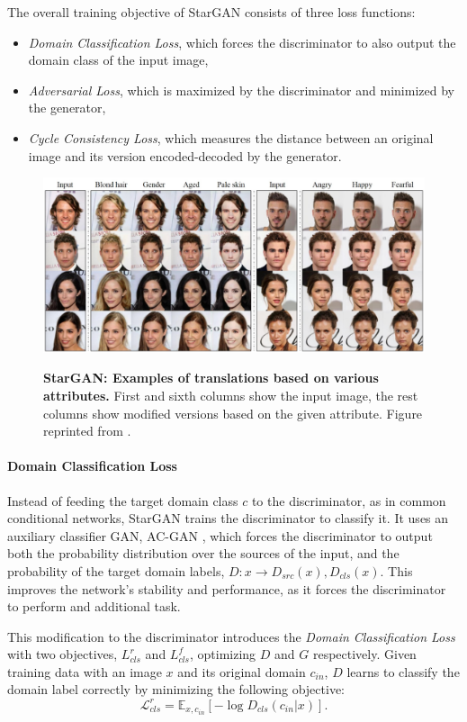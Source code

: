 \documentclass[12pt]{report}
\begin{document}
The overall training objective of StarGAN consists of three loss functions:
\begin{itemize}
\item \textit{Domain Classification Loss}, which forces the discriminator to also output the domain class of the input image,
\item \textit{Adversarial Loss}, which is maximized by the discriminator and minimized by the generator,
\item \textit{Cycle Consistency Loss}, which measures the distance between an original image and its version encoded-decoded by the generator.
\end{itemize}

\begin{figure}[h]
\centering
{\includegraphics[width=.8\linewidth]{03_analysis/gans/stargan_example}}
\caption{\label{fig:stargan_examples} \textbf{StarGAN: Examples of translations based on various attributes.} First and sixth columns show the input image, the rest columns show modified versions based on the given attribute. Figure reprinted from \cite{choi_stargan_2017}.}
\end{figure}

\paragraph{Domain Classification Loss} 
Instead of feeding the target domain class $c$ to the discriminator, as in common conditional networks, StarGAN trains the discriminator to classify it. It uses an auxiliary classifier GAN, AC-GAN \cite{odena_conditional_2016}, which forces the discriminator to output both the probability distribution over the sources of the input, and the probability of the target domain labels, $D: x \rightarrow {D_{src}(x), D_{cls}(x)}$. This improves the network's stability and performance, as it forces the discriminator to perform and additional task.

This modification to the discriminator introduces the \textit{Domain Classification Loss} with two objectives, ${L}^{r}_{cls}$ and ${L}^{f}_{cls}$, optimizing $D$ and $G$ respectively. Given training data with an image $x$ and its original domain $c_{in}$, $D$ learns to classify the domain label correctly by minimizing the following objective:
\begin{equation}
\mathcal{L}^{r}_{cls} = \mathbb{E}_{x,c_{in}}[-\log D_{cls}(c_{in}|x)].
\label{eq:stargan_clsr}
\end{equation}
\end{document}
